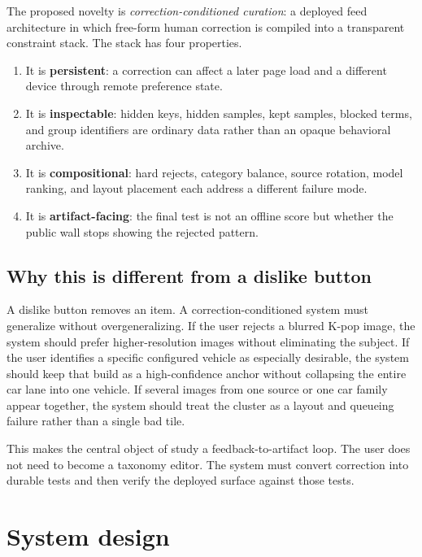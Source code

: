 \documentclass[12pt,letterpaper]{article}
\begin{document}
The proposed novelty is \textit{correction-conditioned curation}: a deployed feed architecture in which free-form human correction is compiled into a transparent constraint stack. The stack has four properties.

\begin{enumerate}
    \item It is \textbf{persistent}: a correction can affect a later page load and a different device through remote preference state.
    \item It is \textbf{inspectable}: hidden keys, hidden samples, kept samples, blocked terms, and group identifiers are ordinary data rather than an opaque behavioral archive.
    \item It is \textbf{compositional}: hard rejects, category balance, source rotation, model ranking, and layout placement each address a different failure mode.
    \item It is \textbf{artifact-facing}: the final test is not an offline score but whether the public wall stops showing the rejected pattern.
\end{enumerate}

\subsection{Why this is different from a dislike button}

A dislike button removes an item. A correction-conditioned system must generalize without overgeneralizing. If the user rejects a blurred K-pop image, the system should prefer higher-resolution images without eliminating the subject. If the user identifies a specific configured vehicle as especially desirable, the system should keep that build as a high-confidence anchor without collapsing the entire car lane into one vehicle. If several images from one source or one car family appear together, the system should treat the cluster as a layout and queueing failure rather than a single bad tile.

This makes the central object of study a feedback-to-artifact loop. The user does not need to become a taxonomy editor. The system must convert correction into durable tests and then verify the deployed surface against those tests.

\section{System design}
\end{document}
